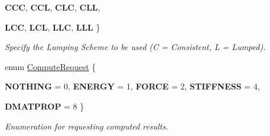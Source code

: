 \begin{DoxyCompactItemize}
{\bfseries CCC}, 
{\bfseries CCL}, 
{\bfseries CLC}, 
{\bfseries CLL}, 
\par
{\bfseries LCC}, 
{\bfseries LCL}, 
{\bfseries LLC}, 
{\bfseries LLL}
 \}
\begin{DoxyCompactList}\small\item\em Specify the Lumping Scheme to be used (C = Consistent, L = Lumped). \item\end{DoxyCompactList}\item 
enum \hyperlink{namespacevoom_a449acd18e685696f17351ba84a9ac7fb}{ComputeRequest} \{ \par
{\bfseries NOTHING} =  0, 
{\bfseries ENERGY} =  1, 
{\bfseries FORCE} =  2, 
{\bfseries STIFFNESS} =  4, 
\par
{\bfseries DMATPROP} =  8
 \}
\begin{DoxyCompactList}\small\item\em Enumeration for requesting computed results. \item\end{DoxyCompactList}\end{DoxyCompactItemize}
